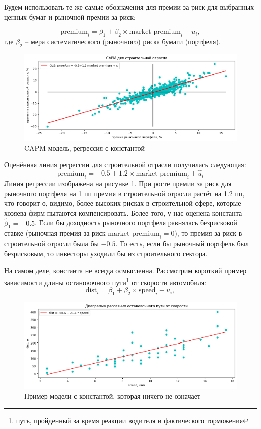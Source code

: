 \documentclass[12pt]{article}
\newcommand{\hb}{\hat{\beta}}
\newcommand{\hu}{\hat{u}}
\begin{document}
Будем использовать те же самые обозначения для премии за риск для выбранных ценных бумаг и рыночной премии за риск:

\[
\text{premium}_i = \beta_1 + \beta_2 \times \text{market-premium}_i + u_i,
\]
где $\beta_2$ – мера систематического (рыночного) риска бумаги (портфеля).

\begin{figure}
    \centering
    \includegraphics[width=0.8\linewidth]{capm_const.png}
    \caption{CAPM модель, регрессия с константой}
    \label{fig:cpam_c}
\end{figure}

\href{https://colab.research.google.com/drive/1ZQ7QuVCJS4I_GsXUrr7z7O-3wqXkXSMN?usp=sharing}{Оценённая} линия регрессии для строительной отрасли получилась следующая: 
\[
\text{premium}_i = -0.5 + 1.2 \times \text{market-premium}_i + \hu_i
\] 
Линия регрессии изображена на рисунке \ref{fig:cpam_c}. 
При росте премии за риск для рыночного портфеля на 1 пп премия в строительной отрасли растёт на 1.2 пп, что говорит о, видимо, более высоких рисках в строительной сфере, которые хозяева фирм пытаются компенсировать. Более того, у нас оценена константа $\hb_1 = -0.5$. 
Если бы доходность рыночного портфеля равнялась безрисковой ставке (рыночная премия за риск $\text{market-premium}_i = 0$), то премия за риск в строительной отрасли была бы $-0.5$. То есть, если бы рыночный портфель был безрисковым, то инвесторы уходили бы из строительного сектора.

На самом деле, константа не всегда осмысленна. 
Рассмотрим короткий пример зависимости длины остановочного пути\footnote{путь, пройденный за время реакции водителя и фактического торможения} от скорости автомобиля: 
\[
\text{dist}_i = \beta_1 + \beta_2 \times \text{speed}_i + u_i,
\]

\begin{figure}
    \centering
    \includegraphics[width=0.8\linewidth]{cars_ds.png}
    \caption{Пример модели с константой, которая ничего не означает}
    \label{fig:cars}
\end{figure}
\end{document}
